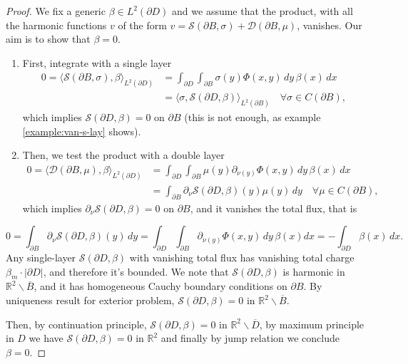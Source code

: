 \documentclass[10pt, a4paper, twoside, openright]{book}
\theoremstyle{definition}
\theoremstyle{plain}
\theoremstyle{plain}
\theoremstyle{plain}
\theoremstyle{plain}
\theoremstyle{plain}
\theoremstyle{plain}
\theoremstyle{plain}
\theoremstyle{plain}
\begin{document}
\begin{proof}
 We fix a generic $\beta \in L^2(\partial D)$ and we assume that the product, with all the harmonic
 functions $v$ of the form $v=\mathcal{S}(\partial B,\sigma) + \mathcal{D}(\partial B, \mu)$, vanishes. Our aim is to show that $\beta=0$.
 \begin{enumerate}
  \item First, integrate with a single layer
 \begin{align*}
  0=\langle\mathcal{S}({\partial B},\sigma), \beta\rangle_{L^2(\partial D)} &= \int_{\partial D} \int_{\partial B} \sigma(y) \Phi(x,y)\,dy\,\beta(x)\,dx \\ 
  &= \langle\sigma, \mathcal{S}({\partial D},\beta)\rangle_{L^2(\partial B)}\quad\forall\sigma\in C(\partial B),
 \end{align*}
 which implies $\mathcal{S}(\partial D,\beta) = 0$ on $\partial B$ (this is not enough, as example \ref{example:van-s-lay} shows).
 \item Then, we test the product with a double layer
 \begin{align*}
  0=\langle\mathcal{D}({\partial B},\mu), \beta\rangle_{L^2(\partial D)} &= \int_{\partial D} \int_{\partial B} \mu(y) \partial_{\nu(y)}\Phi(x,y)\,dy\,\beta(x)\,dx \\
  &= \int_{\partial B} \partial_\nu \mathcal{S}(\partial D, \beta)(y) \mu(y)\, dy\quad \forall \mu\in C(\partial B),
 \end{align*}
 which implies $\partial_\nu \mathcal{S}(\partial D, \beta) = 0$ on $\partial B$, and it vanishes the total flux, that is
 \end{enumerate}
 \begin{equation*}
  0=\int_{\partial B} \partial_\nu \mathcal{S}(\partial D,\beta)(y)\,dy =\int_{\partial D} \int_{\partial B} \partial_{\nu(y)} \Phi(x,y)\, dy \, \beta(x) dx = - \int_{\partial D} \beta(x) \, dx.
 \end{equation*}
 Any single-layer $\mathcal{S}(\partial D, \beta)$ with vanishing total flux has vanishing total charge $\beta_m\cdot |\partial D|$, and therefore it's bounded. 
 We note that $\mathcal{S}(\partial D, \beta)$ is harmonic in $\mathbb{R}^2\backslash\overline{B}$, and it has homogeneous Cauchy boundary conditions on $\partial B$.
 By uniqueness result for exterior problem, $\mathcal{S}(\partial D,\beta) = 0$ in $\mathbb{R}^2\backslash\overline{B}$. 
 \par
 Then, by continuation principle, $\mathcal{S}(\partial D,\beta) = 0$ in $\mathbb{R}^2\backslash\overline{D}$,
 by maximum principle in $D$ we have $\mathcal{S}(\partial D,\beta) = 0$ in $\mathbb{R}^2$ 
 and finally by jump relation we conclude $\beta = 0$.
\end{proof}
\end{document}
